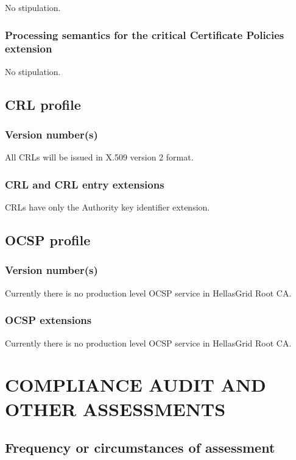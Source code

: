\documentclass[11pt,a4paper,titlepage]{book}
\begin{document}
No stipulation.

\subsection{Processing semantics for the critical Certificate Policies extension}

No stipulation.

\section{CRL profile}
\subsection{Version number(s)}

All CRLs will be issued in X.509 version 2 format.


\subsection{CRL and CRL entry extensions}

CRLs have only the Authority key identifier extension.

\section{OCSP profile}


\subsection{Version number(s)}

Currently there is no production level OCSP service in HellasGrid Root CA.

\subsection{OCSP extensions}

Currently there is no production level OCSP service in HellasGrid Root CA.


\chapter{COMPLIANCE AUDIT AND OTHER ASSESSMENTS}
\section{Frequency or circumstances of assessment}
\end{document}
